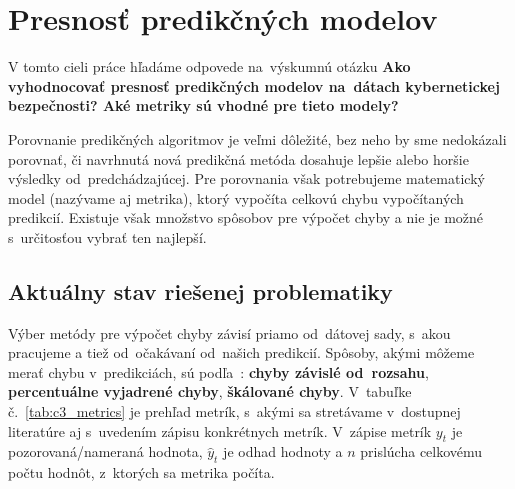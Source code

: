 \documentclass[thesismargins, thesislinespacing, openright, upjsfrontpage]{rnthesis}
\begin{document}
\section{Presnosť predikčných modelov}
V tomto cieli práce hľadáme odpovede na~výskumnú otázku \textbf{Ako vyhodnocovať presnosť predikčných modelov na~dátach kybernetickej bezpečnosti? Aké metriky sú vhodné pre tieto modely?}

Porovnanie predikčných algoritmov je veľmi dôležité, bez neho by sme nedokázali porovnať, či navrhnutá nová predikčná metóda dosahuje lepšie alebo horšie výsledky od~predchádzajúcej. Pre porovnania však potrebujeme matematický model (nazývame aj metrika), ktorý vypočíta celkovú chybu vypočítaných predikcií. Existuje však množstvo spôsobov pre výpočet chyby a nie je možné s~určitosťou vybrať ten najlepší. 

\subsection{Aktuálny stav riešenej problematiky}

Výber metódy pre výpočet chyby závisí priamo od~dátovej sady, s~akou pracujeme a tiež od~očakávaní od~našich predikcií. Spôsoby, akými môžeme merať chybu v~predikciách, sú podľa~\cite{hyndman2018forecasting}:  \textbf{chyby závislé od~rozsahu}, \textbf{percentuálne vyjadrené chyby},  \textbf{škálované chyby}. V~tabuľke č.~\ref{tab:c3_metrics} je prehľad metrík, s~akými sa stretávame v~dostupnej literatúre aj s~uvedením zápisu konkrétnych metrík. V~zápise metrík $y_t$ je pozorovaná/nameraná hodnota, $\hat{y}_{t}$ je odhad hodnoty a $n$ prislúcha celkovému počtu hodnôt, z~ktorých sa metrika počíta.
\end{document}
